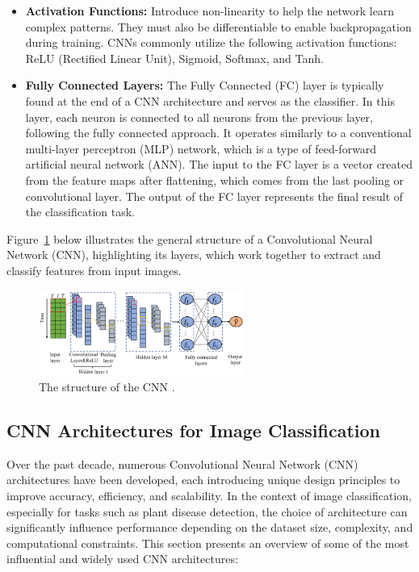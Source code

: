 \begin{itemize}
    \item \textbf{Activation Functions:} Introduce non-linearity to help the network learn complex patterns. They must also be differentiable to enable backpropagation during training. CNNs commonly utilize the following activation functions: ReLU (Rectified Linear Unit), Sigmoid, Softmax, and Tanh.
    \item \textbf{Fully Connected Layers:} The Fully Connected (FC) layer is typically found at the end of a CNN architecture and serves as the classifier. In this layer, each neuron is connected to all neurons from the previous layer, following the fully connected approach. It operates similarly to a conventional multi-layer perceptron (MLP) network, which is a type of feed-forward artificial neural network (ANN). The input to the FC layer is a vector created from the feature maps after flattening, which comes from the last pooling or convolutional layer. The output of the FC layer represents the final result of the classification task.
    
\end{itemize}

Figure~\ref{fig:figure07} below illustrates the general structure of a Convolutional Neural Network (CNN), highlighting its layers, which work together to extract and classify features from input images.

\begin{figure}[H] %
    \centering
    \includegraphics[width=0.6\textwidth]{chapters/chapter1/images/Figure07.png}
    \caption{The structure of the CNN \parencite{crocioni2020li}.}
    \label{fig:figure07}
\end{figure}


\subsection{CNN Architectures for Image Classification}
Over the past decade, numerous Convolutional Neural Network (CNN) architectures have been developed, each introducing unique design principles to improve accuracy, efficiency, and scalability. In the context of image classification, especially for tasks such as plant disease detection, the choice of architecture can significantly influence performance depending on the dataset size, complexity, and computational constraints.
This section presents an overview of some of the most influential and widely used CNN architectures:
